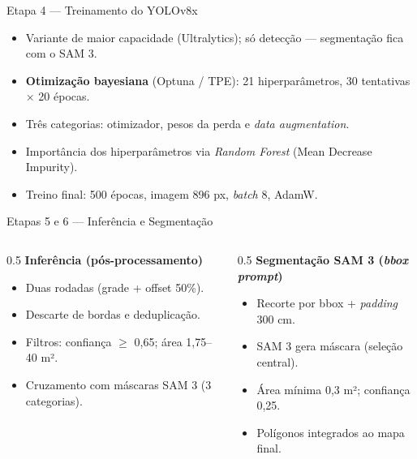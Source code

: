 \documentclass[aspectratio=169, 11pt]{beamer}
\begin{document}
\begin{frame}{Etapa 4 — Treinamento do YOLOv8x}
    \begin{itemize}
        \item Variante de maior capacidade (Ultralytics); só detecção — segmentação fica com o SAM 3.
        \item \textbf{Otimização bayesiana} (Optuna / TPE): 21 hiperparâmetros, 30 tentativas $\times$ 20 épocas.
        \item Três categorias: otimizador, pesos da perda e \textit{data augmentation}.
        \item Importância dos hiperparâmetros via \textit{Random Forest} (Mean Decrease Impurity).
        \item Treino final: 500 épocas, imagem 896 px, \textit{batch} 8, AdamW.
    \end{itemize}
\end{frame}

\begin{frame}{Etapas 5 e 6 — Inferência e Segmentação}
    \begin{columns}
        \begin{column}{0.5\textwidth}
            \textbf{Inferência (pós-processamento)}
            \begin{itemize}
                \small
                \item Duas rodadas (grade + offset 50\%).
                \item Descarte de bordas e deduplicação.
                \item Filtros: confiança $\geq$ 0,65; área 1,75–40 m².
                \item Cruzamento com máscaras SAM 3 (3 categorias).
            \end{itemize}
        \end{column}
        \begin{column}{0.5\textwidth}
            \textbf{Segmentação SAM 3 (\textit{bbox prompt})}
            \begin{itemize}
                \small
                \item Recorte por bbox + \textit{padding} 300 cm.
                \item SAM 3 gera máscara (seleção central).
                \item Área mínima 0,3 m²; confiança 0,25.
                \item Polígonos integrados ao mapa final.
            \end{itemize}
        \end{column}
    \end{columns}
\end{frame}
\end{document}
